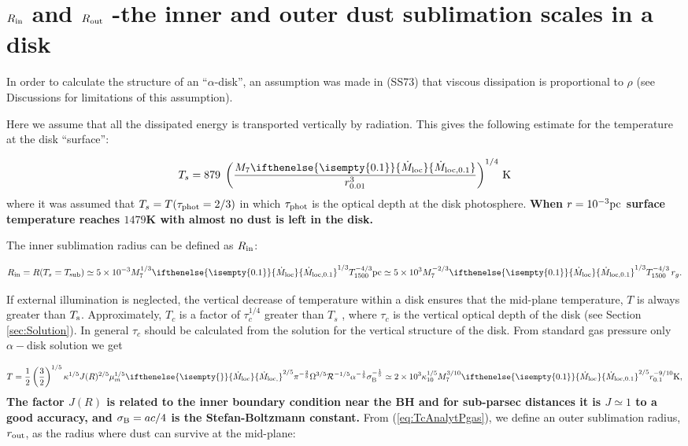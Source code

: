 \documentclass[12pt,english,preprint]{aastex}
\newcommand{\mybf}{\bf}
\newcommand{\su}[2]{#1_{\rm #2}}
\newcommand{\mdt}[1][]{ 
  \ifthenelse{\isempty{#1}}
  {\dot{M}_{\rm loc}}
  { {\dot M}_{\rm{loc},{#1}} } 
  } %
\newcommand{\Tc}{T}
\begin{document}
\section{$\su{R}{in}$ and $\su{R}{out}$ -the inner and outer dust sublimation
scales in a disk}

In order to calculate the structure of an ``$\alpha$-disk'', an
assumption was made in (SS73) that viscous dissipation is proportional
to $\rho$ (see Discussions for limitations of this assumption).

Here we assume that all the dissipated energy is transported vertically
by radiation. This gives the following estimate for the temperature
at the disk ``surface'':

\begin{equation}
T_{{s}}=879\;\left(\frac{M_{7}\mdt[0.1]}{r_{0.01}^{3}}\right)^{1/4}\text{\,K}\label{eq:Teff}
\end{equation}
where it was assumed that $T_{s}=T(\tau_{{\rm phot}}=2/3)$ in which
$\tau_{{\rm phot}}$ is the optical depth at the disk photosphere.
{\mybf When $r=10^{-3}{\rm pc}$ surface temperature reaches 
$1479$K
with almost no dust is left in the disk.}

The inner sublimation radius
can be defined as $\su{R}{in}$:

\begin{equation}
\su{R}{in}=R(T_s=T_{{\rm sub}})\simeq5\times10^{-3}M_{7}^{1/3}\mdt[0.1]^{1/3}T_{1500}
^{-4/3}{\rm pc}\simeq5\times10^{3}M_{7}^{-2/3}\mdt[0.1]^{1/3}T_{1500}^{-4/3}\,r_g.\label{eq:Rin}
\end{equation}

If external illumination is neglected, the vertical decrease of temperature
within a disk ensures that the mid-plane temperature, $\Tc$
is always greater than $T_{{\rm s}}$. Approximately, 
$T_{c}$ is a factor of $\tau_{c}^{1/4}$ greater than $T_{s}$
, where $\tau_{c}$ is the vertical optical depth of the disk (see Section \ref{sec:Solution}). 
In general $\tau_{c}$ should be calculated from the solution for
the vertical structure of the disk. From standard gas pressure only
$\alpha-$disk solution we get

\begin{equation}
\Tc=\frac{1}{2}\left(\frac{3}{2}\right)^{1/5}\kappa^{1/5}J(R)^{2/5}\mu_m^{1/5}
\text{\ensuremath{ \mdt }}^{2/5}\pi^{-\frac{2}{5}}\Omega^{3/5}{\cal R}^{-1/5}
\alpha^{-\frac{1}{5}}\su{\sigma}{B}^{-\frac{1}{5}}\simeq2\times10^{3}\kappa_{10}^{1/5}M_{7}^{3/10}
\text{\ensuremath{\mdt[0.1]}}^{2/5}r_{0.1}^{-9/10}{\rm K}\mbox{,}\label{eq:TcAnalytPgas}
\end{equation}
{\mybf The factor $J(R)$ is related to the inner boundary condition near the BH and for sub-parsec distances
it is $J\simeq1$ to a good accuracy, and $\su{\sigma}{B}= ac/4$ is the Stefan-Boltzmann constant.}
From (\ref{eq:TcAnalytPgas}), we define an outer sublimation radius, $r_{{\rm out}}$,
as the radius where dust can survive at the mid-plane:
\end{document}
